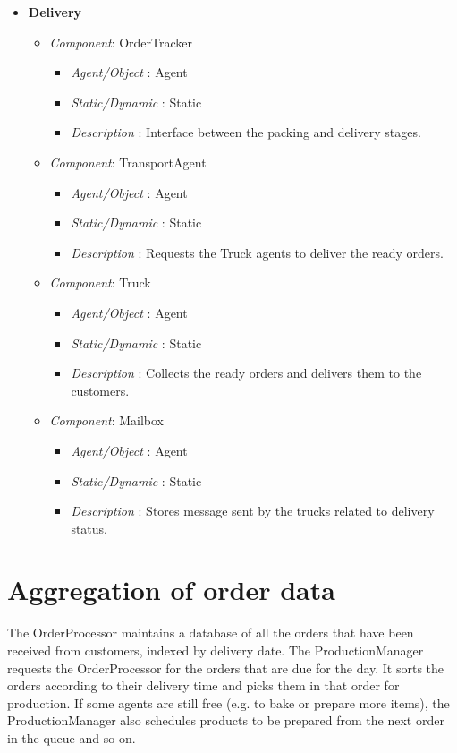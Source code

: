 \documentclass[11pt, a4paper]{article}
\begin{document}
\begin{itemize}
	\item \textbf{Delivery}
	\begin{itemize}
	\item \textit{Component}: OrderTracker
	\begin{itemize}
		\item \textit{Agent/Object} : Agent
		\item \textit{Static/Dynamic} : Static
		\item \textit{Description} : Interface between the packing and delivery stages.
	\end{itemize}
	\item \textit{Component}: TransportAgent
	\begin{itemize}
		\item \textit{Agent/Object} : Agent
		\item \textit{Static/Dynamic} : Static
		\item \textit{Description} : Requests the Truck agents to deliver the ready orders.
	\end{itemize}
	\item \textit{Component}: Truck
	\begin{itemize}
		\item \textit{Agent/Object} : Agent
		\item \textit{Static/Dynamic} : Static
		\item \textit{Description} : Collects the ready orders and delivers them to the customers.
	\end{itemize}
	\item \textit{Component}: Mailbox
	\begin{itemize}
		\item \textit{Agent/Object} : Agent
		\item \textit{Static/Dynamic} : Static
		\item \textit{Description} : Stores message sent by the trucks related to delivery status.
	\end{itemize}
	\end{itemize}

\end{itemize}


\newpage
\section{Aggregation of order data}

The OrderProcessor maintains a database of all the orders that have been received from customers, indexed by delivery date. The ProductionManager requests the OrderProcessor for the orders that are due for the day. It sorts the orders according to their delivery time and picks them in that order for production. If some agents are still free (e.g. to bake or prepare more items), the ProductionManager also schedules products to be prepared from the next order in the queue and so on.
\end{document}
